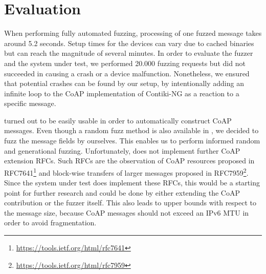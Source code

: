 \section{Evaluation}
\label{section:evaluation}


When performing fully automated fuzzing, processing of one fuzzed message takes around 5.2 seconds. Setup times for the devices can vary due to cached binaries but can reach the magnitude of several minutes. In order to evaluate the fuzzer and the system under test, we performed 20.000 fuzzing requests but did not succeeded in causing a crash or a device malfunction. Nonetheless, we ensured that potential crashes can be found by our setup, by intentionally adding an infinite loop to the CoAP implementation of Contiki-NG as a reaction to a specific message.

\scapy turned out to be easily usable in order to automatically construct CoAP messages. Even though a random fuzz method is also available in \scapy, we decided to fuzz the message fields by ourselves. This enables us to perform informed random and generational fuzzing. Unfortunately, \scapy does not implement further CoAP extension RFCs. Such RFCs are the observation of CoAP resources proposed in RFC7641\footnote{\url{https://tools.ietf.org/html/rfc7641}} and block-wise transfers of larger messages proposed in RFC7959\footnote{\url{https://tools.ietf.org/html/rfc7959}}. Since the system under test does implement these RFCs, this would be a starting point for further research and could be done by either extending the \scapy CoAP contribution or the fuzzer itself. This also leads to upper bounds with respect to the message size, because CoAP messages should not exceed an IPv6 MTU in order to avoid fragmentation.
